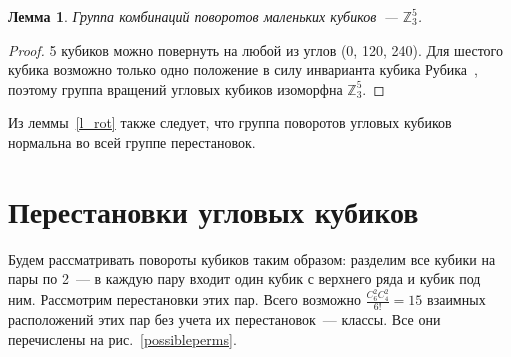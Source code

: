 \documentclass[utf8,a4paper,12pt]{article}
\newtheorem{lemma_cub}{Лемма}[section]
\begin{document}
\begin{lemma_cub}
Группа комбинаций поворотов маленьких кубиков~--- $\mathbb{Z}_3^5$.
\end{lemma_cub}
\begin{proof}
	5 кубиков можно повернуть на любой из углов (0\textdegree, 120\textdegree, 240\textdegree). Для шестого кубика возможно только одно положение в силу инварианта кубика Рубика~\cite{dubr}, поэтому группа вращений угловых кубиков изоморфна $\mathbb{Z}_3^5$.
\end{proof}
Из леммы~\ref{l_rot} также следует, что группа поворотов угловых кубиков нормальна во всей группе перестановок.
\section{Перестановки угловых кубиков}
Будем рассматривать повороты кубиков таким образом: разделим все кубики на пары по 2~--- в каждую пару входит один кубик с верхнего ряда и кубик под ним. Рассмотрим перестановки этих пар. Всего возможно $\frac{C^2_6C^2_4}{6!}=15$ взаимных расположений этих пар без учета их перестановок~--- классы. Все они перечислены на рис.~\ref{possibleperms}.
\end{document}
